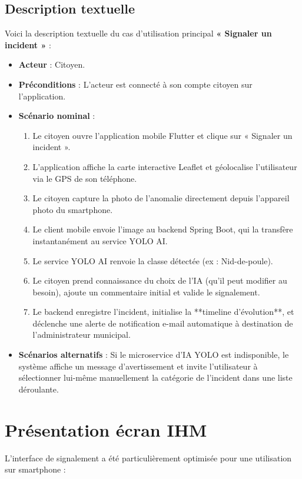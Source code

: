 \subsection{Description textuelle}
Voici la description textuelle du cas d'utilisation principal \textbf{« Signaler un incident »} :
\begin{itemize}
    \item \textbf{Acteur} : Citoyen.
    \item \textbf{Préconditions} : L'acteur est connecté à son compte citoyen sur l'application.
    \item \textbf{Scénario nominal} :
    \begin{enumerate}
        \item Le citoyen ouvre l'application mobile Flutter et clique sur « Signaler un incident ».
        \item L'application affiche la carte interactive Leaflet et géolocalise l'utilisateur via le GPS de son téléphone.
        \item Le citoyen capture la photo de l'anomalie directement depuis l'appareil photo du smartphone.
        \item Le client mobile envoie l'image au backend Spring Boot, qui la transfère instantanément au service YOLO AI.
        \item Le service YOLO AI renvoie la classe détectée (ex : Nid-de-poule).
        \item Le citoyen prend connaissance du choix de l'IA (qu'il peut modifier au besoin), ajoute un commentaire initial et valide le signalement.
        \item Le backend enregistre l'incident, initialise la **timeline d'évolution**, et déclenche une alerte de notification e-mail automatique à destination de l'administrateur municipal.
    \end{enumerate}
    \item \textbf{Scénarios alternatifs} : Si le microservice d'IA YOLO est indisponible, le système affiche un message d'avertissement et invite l'utilisateur à sélectionner lui-même manuellement la catégorie de l'incident dans une liste déroulante.
\end{itemize}

\section{Présentation écran IHM}
L'interface de signalement a été particulièrement optimisée pour une utilisation sur smartphone :

